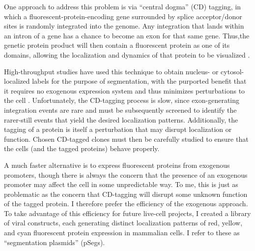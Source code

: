 One approach to address this problem is via ``central dogma'' (CD)
tagging, in which a fluorescent-protein-encoding gene surrounded by
splice acceptor/donor sites is randomly integrated
into the genome. Any integration that lands within an intron of a gene
has a chance to become an exon for that same gene. Thus,the genetic protein
product will then contain a fluorescent protein as one of its domains,
allowing the localization and dynamics of that protein to be visualized
\cite{Jarvik1996,Jarvik2002}.


High-throughput studies have used this technique to obtain
nucleus- or cytosol-localized labels for the purpose of segmentation,
with the purported benefit that it requires no exogenous expression system
and thus minimizes perturbations to the cell
\cite{Sigal2006,Sigal2007,Sigal2006a,Issaeva2010}. Unfortunately,
the CD-tagging process is slow, since exon-generating integration
events are rare and must be subsequently screened to identify
the rarer-still events that yield the desired localization patterns.
Additionally, the tagging of a protein is itself a perturbation that
may disrupt localization or function. Chosen CD-tagged clones must
then be carefully studied to ensure that the cells (and the tagged
proteins) behave properly.


A much faster alternative is to express
fluorescent proteins from exogenous promoters, though there is
always the concern that the presence of an exogenous promoter may
affect the cell in some unpredictable way. To me, this
is just as problematic as the concern that CD-tagging will
disrupt some unknown function of the tagged protein.
I therefore prefer the efficiency of the exogenous approach.
To take advantage of this efficiency for future live-cell projects, I
created a library of viral constructs, each generating distinct
localization patterns of red, yellow, and cyan fluorescent
protein expression in mammalian cells. I refer to these
as ``segmentation plasmids'' (pSegs).


